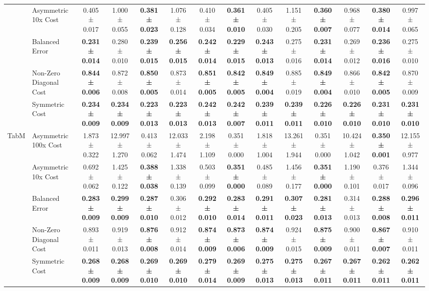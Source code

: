 \begin{table}[H]
{\begin{tabular}{llcccccccccccc}
 & Asymmetric 10x Cost & 0.405 ± 0.017 & 1.000 ± 0.055 & \textbf{0.381 ± 0.023} & 1.076 ± 0.128 & 0.410 ± 0.034 & \textbf{0.361 ± 0.010} & 0.405 ± 0.030 & 1.151 ± 0.205 & \textbf{0.360 ± 0.007} & 0.968 ± 0.077 & \textbf{0.380 ± 0.014} & 0.997 ± 0.065 \\
 & Balanced Error & \textbf{0.231 ± 0.014} & 0.280 ± 0.010 & \textbf{0.239 ± 0.015} & \textbf{0.256 ± 0.015} & \textbf{0.242 ± 0.014} & \textbf{0.229 ± 0.015} & \textbf{0.243 ± 0.013} & 0.275 ± 0.016 & \textbf{0.231 ± 0.014} & 0.269 ± 0.012 & \textbf{0.236 ± 0.016} & 0.275 ± 0.010 \\
 & Non-Zero Diagonal Cost & \textbf{0.844 ± 0.006} & 0.872 ± 0.008 & \textbf{0.850 ± 0.005} & 0.873 ± 0.014 & \textbf{0.851 ± 0.005} & \textbf{0.842 ± 0.005} & \textbf{0.849 ± 0.004} & 0.885 ± 0.019 & \textbf{0.849 ± 0.004} & 0.866 ± 0.010 & \textbf{0.842 ± 0.005} & 0.870 ± 0.009 \\
 & Symmetric Cost & \textbf{0.234 ± 0.009} & \textbf{0.234 ± 0.009} & \textbf{0.223 ± 0.013} & \textbf{0.223 ± 0.013} & \textbf{0.242 ± 0.013} & \textbf{0.242 ± 0.007} & \textbf{0.239 ± 0.011} & \textbf{0.239 ± 0.011} & \textbf{0.226 ± 0.010} & \textbf{0.226 ± 0.010} & \textbf{0.231 ± 0.010} & \textbf{0.231 ± 0.010} \\
\cline{1-14}
\multirow[t]{5}{*}{TabM} & Asymmetric 100x Cost & 1.873 ± 0.322 & 12.997 ± 1.270 & 0.413 ± 0.062 & 12.033 ± 1.474 & 2.198 ± 1.109 & 0.351 ± 0.000 & 1.818 ± 1.004 & 13.261 ± 1.944 & 0.351 ± 0.000 & 10.424 ± 1.042 & \textbf{0.350 ± 0.001} & 12.155 ± 0.977 \\
 & Asymmetric 10x Cost & 0.692 ± 0.062 & 1.425 ± 0.122 & \textbf{0.388 ± 0.038} & 1.338 ± 0.139 & 0.503 ± 0.099 & \textbf{0.351 ± 0.000} & 0.485 ± 0.089 & 1.456 ± 0.177 & \textbf{0.351 ± 0.000} & 1.190 ± 0.101 & 0.376 ± 0.017 & 1.344 ± 0.096 \\
 & Balanced Error & \textbf{0.283 ± 0.009} & \textbf{0.299 ± 0.009} & \textbf{0.287 ± 0.010} & 0.306 ± 0.012 & \textbf{0.292 ± 0.010} & \textbf{0.283 ± 0.014} & \textbf{0.291 ± 0.011} & \textbf{0.307 ± 0.023} & \textbf{0.281 ± 0.013} & 0.314 ± 0.013 & \textbf{0.288 ± 0.008} & \textbf{0.296 ± 0.011} \\
 & Non-Zero Diagonal Cost & 0.893 ± 0.011 & 0.919 ± 0.013 & \textbf{0.876 ± 0.008} & 0.912 ± 0.014 & \textbf{0.874 ± 0.009} & \textbf{0.873 ± 0.006} & \textbf{0.874 ± 0.009} & 0.924 ± 0.015 & \textbf{0.875 ± 0.009} & 0.900 ± 0.011 & \textbf{0.867 ± 0.007} & 0.910 ± 0.011 \\
 & Symmetric Cost & \textbf{0.268 ± 0.009} & \textbf{0.268 ± 0.009} & \textbf{0.269 ± 0.010} & \textbf{0.269 ± 0.010} & \textbf{0.279 ± 0.014} & \textbf{0.269 ± 0.009} & \textbf{0.275 ± 0.013} & \textbf{0.275 ± 0.013} & \textbf{0.267 ± 0.011} & \textbf{0.267 ± 0.011} & \textbf{0.262 ± 0.011} & \textbf{0.262 ± 0.011} \\

\end{tabular}}
\end{table}
